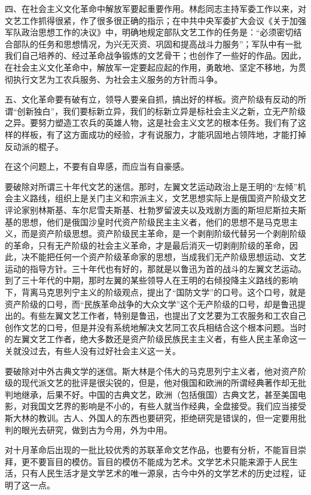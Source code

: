 四、在社会主义文化革命中解放军要起重要作用。林彪同志主持军委工作以来，对文艺工作抓得很紧，作了很多很正确的指示；在中共中央军委扩大会议《关于加强军队政治思想工作的决议》中，明确地规定部队文艺工作的任务是：“必须密切结合部队的任务和思想情况，为兴无灭资、巩固和提高战斗力服务”；军队中有一批我们自己培养的、经过革命战争锻炼的文艺骨干；也创作了一些好的作品。因此，在社会主义文化革命中，解放军一定要起应起的作用，勇敢地、坚定不移地，为贯彻执行文艺为工农兵服务、为社会主义服务的方针而斗争。

五、文化革命要有破有立，领导人要亲自抓，搞出好的样板。资产阶级有反动的所谓“创新独白”，我们要标新立异，我们的标新立异是标社会主义之新，立无产阶级之异。要努力塑造工农兵的英雄人物，这是社会主义文艺的根本任务。我们有了这样的样板，有了这方面成功的经验，才有说服力，才能巩固地占领阵地，才能打掉反动派的棍子。

在这个问题上，不要有自卑感，而应当有自豪感。

要破除对所谓三十年代文艺的迷信。那时，左翼文艺运动政治上是王明的“左倾”机会主义路线，组织上是关门主义和宗派主义，文艺思想实际上是俄国资产阶级文艺评论家别林斯基、车尔尼雪夫斯基、杜勃罗留波夫以及戏剧方面的斯坦尼斯拉夫斯基的思想，他们是俄国沙皇时代资产阶级民主主义者，他们的思想不是马克思主义，而是资产阶级思想。资产阶级民主革命，是一个剥削阶级代替另一个剥削阶级的革命，只有无产阶级的社会主义革命，才是最后消灭一切剥削阶级的革命，因此，决不能把任何一个资产阶级革命家的思想，当成我们无产阶级思想运动、文艺运动的指导方针。三十年代也有好的，那就是以鲁迅为首的战斗的左翼文艺运动。到了三十年代的中期，那时左翼的某些领导人在王明的右倾投降主义路线的影响下，背离马克思列宁主义的阶级观点，提出了“国防文学”的口号。这个口号，就是资产阶级的口号，而“民族革命战争的大众文学”这个无产阶级的口号，却是鲁迅提出的。有些左翼文艺工作者，特别是鲁迅，也提出了文艺要为工农服务和工农自己创作文艺的口号，但是并没有系统地解决文艺同工农兵相结合这个根本问题。当时的左翼文艺工作者，绝大多数还是资产阶级民族民主主义者，有些人民主革命这一关就没过去，有些人没有过好社会主义这一关。

要破除对中外古典文学的迷信。斯大林是个伟大的马克思列宁主义者，他对资产阶级的现代派文艺的批评是很尖锐的，但是，他对俄国和欧洲的所谓经典著作却无批判地继承，后果不好。中国的古典文艺，欧洲（包括俄国）古典文艺，甚至美国电影，对我国文艺界的影响是不小的，有些人就当作经典，全盘接受。我们应当接受斯大林的教训。古人、外国人的东西也要研究，拒绝研究是错误的，但一定要用批判的眼光去研究，做到古为今用，外为中用。

对十月革命后出现的一批比较优秀的苏联革命文艺作品，也要有分析，不能盲目崇拜，更不要盲目的模仿。盲目的模仿不能成为艺术。文学艺术只能来源于人民生活，只有人民生活才是文学艺术的唯一源泉，古今中外的文学艺术的历史过程，证明了这一点。

